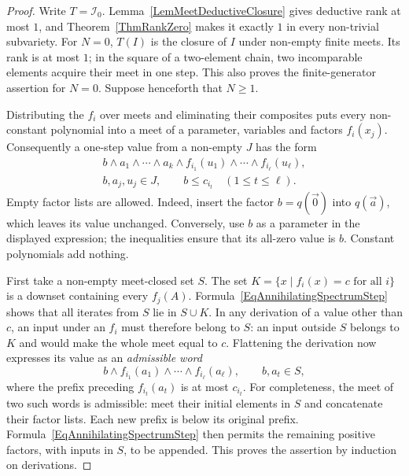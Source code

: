 \documentclass[12pt,english]{amsart}
\theoremstyle{definition}
\numberwithin{equation}{section}
\theoremstyle{remark}
\begin{document}
\begin{proof}
Write $T=\mathcal I_0$. Lemma~\ref{LemMeetDeductiveClosure} gives
deductive rank at most $1$, and Theorem~\ref{ThmRankZero} makes it exactly
$1$ in every non-trivial subvariety. For $N=0$, $T(I)$ is the closure of
$I$ under non-empty finite meets. Its rank is at most $1$; in the square
of a two-element chain, two incomparable elements acquire their meet in
one step. This also proves the finite-generator assertion for $N=0$.
Suppose henceforth that $N\geqslant1$.

Distributing the $f_i$ over meets and eliminating their composites puts
every non-constant polynomial into a meet of a parameter, variables and
factors $f_i(x_j)$. Consequently a one-step value from a non-empty $J$
has the form
\begin{equation}\label{EqAnnihilatingSpectrumStep}
\begin{gathered}
b\wedge a_1\wedge\cdots\wedge a_k
 \wedge f_{i_1}(u_1)\wedge\cdots\wedge f_{i_\ell}(u_\ell),\\
b,a_j,u_j\in J,\qquad b\leqslant c_{i_t}\quad(1\leqslant t\leqslant\ell).
\end{gathered}
\end{equation}
Empty factor lists are allowed. Indeed, insert the factor
$b=q(\vec0)$ into $q(\vec a)$, which leaves its value unchanged.
Conversely, use $b$ as a parameter in the displayed expression; the
inequalities ensure that its all-zero value is $b$.
Constant polynomials add nothing.

First take a non-empty meet-closed set $S$. The set
$K=\{x\mid f_i(x)=c\text{ for all }i\}$ is a downset containing every
$f_j(A)$. Formula~\eqref{EqAnnihilatingSpectrumStep} shows that all
iterates from $S$ lie in $S\cup K$. In any derivation of a value other
than $c$, an input under an $f_i$ must therefore belong to $S$: an input
outside $S$ belongs to $K$ and would make the whole meet equal to $c$.
Flattening the derivation now expresses its value as an \emph{admissible
word}
\[
b\wedge f_{i_1}(a_1)\wedge\cdots\wedge f_{i_\ell}(a_\ell),
\qquad b,a_t\in S,
\]
where the prefix preceding $f_{i_t}(a_t)$ is at most $c_{i_t}$.
For completeness, the meet of two such words is admissible: meet their
initial elements in $S$ and concatenate their factor lists. Each new
prefix is below its original prefix. Formula~\eqref{EqAnnihilatingSpectrumStep}
then permits the remaining positive factors, with inputs in $S$, to be
appended. This proves the assertion by induction on derivations.


\end{proof}
\end{document}
